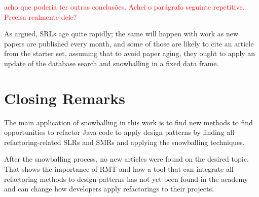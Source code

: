 \textcolor{red}{acho que poderia ter outras conclusões. Achei o parágrafo seguinte repetitive. Precisa realmente dele?}

As argued, SRLs age quite rapidly; the same will happen with work as new papers are published every month, and some of those are likely to cite an article from the starter set, assuming that to avoid paper aging, they ought to apply an update of the database search and snowballing in a fixed data frame.

\section{Closing Remarks}
\label{sec-cloasing-remarks}

The main application of snowballing in this work is to find new methods to find opportunities to refactor Java code to apply design patterns by finding all refactoring-related SLRs and SMRs and applying the snowballing techniques. 

After the snowballing process, no new articles were found on the desired topic. That shows the importance of RMT and how a tool that can integrate all refactoring methods to design patterns has not yet been found in the academy and can change how developers apply refactorings to their projects.